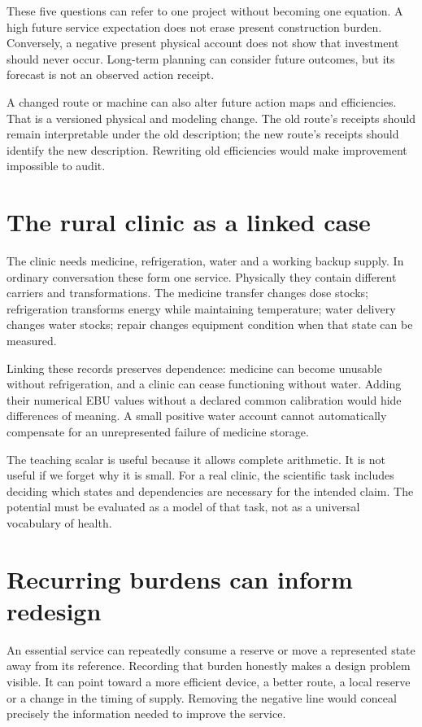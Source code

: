 These five questions can refer to one project without becoming one equation. A high future service expectation does not erase present construction burden. Conversely, a negative present physical account does not show that investment should never occur. Long-term planning can consider future outcomes, but its forecast is not an observed action receipt.

A changed route or machine can also alter future action maps and efficiencies. That is a versioned physical and modeling change. The old route's receipts should remain interpretable under the old description; the new route's receipts should identify the new description. Rewriting old efficiencies would make improvement impossible to audit.

\section{The rural clinic as a linked case}
The clinic needs medicine, refrigeration, water and a working backup supply. In ordinary conversation these form one service. Physically they contain different carriers and transformations. The medicine transfer changes dose stocks; refrigeration transforms energy while maintaining temperature; water delivery changes water stocks; repair changes equipment condition when that state can be measured.

Linking these records preserves dependence: medicine can become unusable without refrigeration, and a clinic can cease functioning without water. Adding their numerical EBU values without a declared common calibration would hide differences of meaning. A small positive water account cannot automatically compensate for an unrepresented failure of medicine storage.

The teaching scalar is useful because it allows complete arithmetic. It is not useful if we forget why it is small. For a real clinic, the scientific task includes deciding which states and dependencies are necessary for the intended claim. The potential must be evaluated as a model of that task, not as a universal vocabulary of health.

\section{Recurring burdens can inform redesign}
An essential service can repeatedly consume a reserve or move a represented state away from its reference. Recording that burden honestly makes a design problem visible. It can point toward a more efficient device, a better route, a local reserve or a change in the timing of supply. Removing the negative line would conceal precisely the information needed to improve the service.

